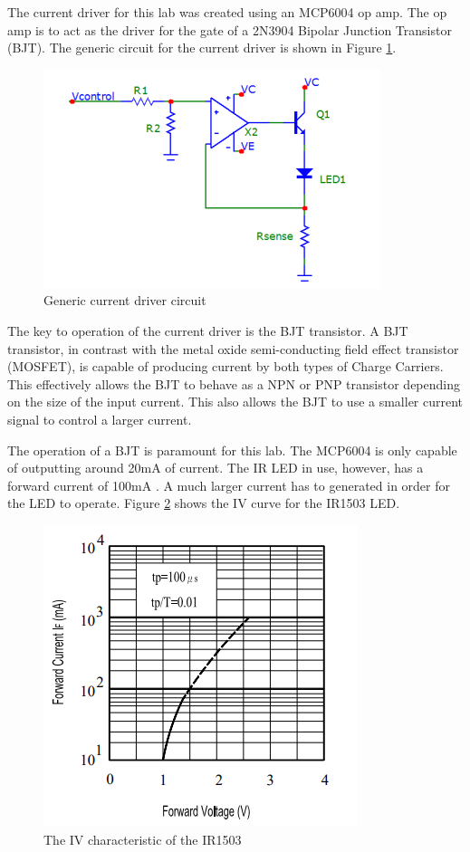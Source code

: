 
The current driver for this lab was created using an MCP6004 op amp. The op amp is to act as the driver for the gate of a 2N3904 Bipolar Junction Transistor (BJT). The generic circuit for the current driver is shown in Figure \ref{fig:currentgeneric}. 
	
	\begin{figure}[H]
		\centering
		\includegraphics[width=.6\textwidth]{CircuitDevelopment/ledgeneric.png}
		\caption{Generic current driver circuit \cite{b1}}
		\label{fig:currentgeneric}
	\end{figure}

The key to operation of the current driver is the BJT transistor. A BJT transistor, in contrast with the metal oxide semi-conducting field effect transistor (MOSFET), is capable of producing current by both types of Charge Carriers. This effectively allows the BJT to behave as a NPN or PNP transistor depending on the size of the input current. This also allows the BJT to use a smaller current signal to control a larger current. 

The operation of a BJT is paramount for this lab. The MCP6004 is only capable of outputting around 20mA of current. The IR LED in use, however, has a forward current of 100mA \cite{LEDDATA}. A much larger current has to generated in order for the LED to operate. Figure \ref{fig:ivsvled} shows the IV curve for the IR1503 LED.


\begin{figure}[H]
	\centering
	\includegraphics[width=0.45\linewidth]{CircuitDevelopment/IvsVled}
	\caption[Current vs voltage]{The IV characteristic of the IR1503 \cite{LEDDATA}}
	\label{fig:ivsvled}
\end{figure}


